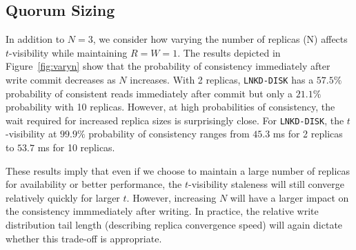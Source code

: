 \documentclass{vldb}
\newcommand{\subsectionskip}{-0em}
\begin{document}
\vspace{\subsectionskip}\subsection{Quorum Sizing}

In addition to $N$$=$$3$, we consider how varying the number of
replicas (N) affects $t$-visibility while maintaining
$R$$=$$W$$=$$1$. The results depicted in Figure~\ref{fig:varyn} show
that the probability of consistency immediately after write commit
decreases as $N$ increases.  With 2 replicas, \texttt{LNKD-DISK} has a
$57.5\%$ probability of consistent reads immediately after commit but
only a $21.1\%$ probability with 10 replicas.  However, at high
probabilities of consistency, the wait required for increased replica
sizes is surprisingly close.  For \texttt{LNKD-DISK}, the
$t$-visibility at $99.9\%$ probability of consistency ranges from
$45.3$ ms for 2 replicas to $53.7$ ms for 10 replicas.

These results imply that even if we choose to maintain a large number
of replicas for availability or better performance, the $t$-visibility
staleness will still converge relatively quickly for larger $t$.
However, increasing $N$ will have a larger impact on the consistency
immmediately after writing.  In practice, the relative write
distribution tail length (describing replica convergence speed) will
again dictate whether this trade-off is appropriate.
\end{document}
